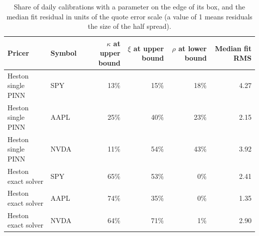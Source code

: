 \begin{table}[t]
\centering
\small
\caption{Share of daily calibrations with a parameter on the edge of its box, and the median fit residual in units of the quote error scale (a value of 1 means residuals the size of the half spread).}
\label{tab:edge}
\begin{tabular}{llrrrr}
\toprule
Pricer & Symbol & $\kappa$ at upper bound & $\xi$ at upper bound & $\rho$ at lower bound & Median fit RMS \\
\midrule
Heston single PINN & SPY & 13\% & 15\% & 18\% & 4.27 \\
Heston single PINN & AAPL & 25\% & 40\% & 23\% & 2.15 \\
Heston single PINN & NVDA & 11\% & 54\% & 43\% & 3.92 \\
Heston exact solver & SPY & 65\% & 53\% & 0\% & 2.41 \\
Heston exact solver & AAPL & 74\% & 35\% & 0\% & 1.35 \\
Heston exact solver & NVDA & 64\% & 71\% & 1\% & 2.90 \\
\bottomrule
\end{tabular}
\end{table}
